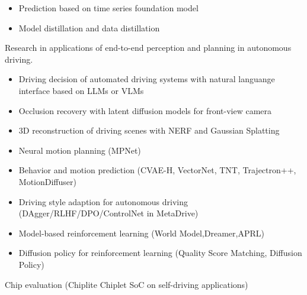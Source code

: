 \documentclass[../cv.tex]{subfiles}
\begin{document}
\begin{cventries}
{\begin{cvitems}
\begin{itemize}
				      $\rightarrow$ \textbf{funes-ts} \href{https://github.com/binjian/funes-ts/}{\faGithub}
				\item Prediction based on time series foundation model
				\item Model distillation and data distillation
			\end{itemize}
			\item Research in applications of end-to-end perception and planning in autonomous driving.
			\begin{itemize}
				\item Driving decision of automated driving systems with natural languange interface based on LLMs or VLMs \supercite{Xin_LLM_24}  \supercite{Xin_VLM_24}
				\item Occlusion recovery with latent diffusion models for front-view camera \supercite{Xin_Latent_Diffusion_23}
				\item 3D reconstruction of driving scenes with NERF and Gaussian Splatting
				\item Neural motion planning (MPNet)
				\item Behavior and motion prediction (CVAE-H, VectorNet, TNT, Trajectron++, MotionDiffuser)
				\item Driving style adaption for autonomous driving (DAgger/RLHF/DPO/ControlNet in MetaDrive)
				\item Model-based reinforcement learning (World Model,Dreamer,APRL)
				\item Diffusion policy for reinforcement learning (Quality Score Matching, Diffusion Policy)
			\end{itemize}
			\item Chip evaluation (Chiplite Chiplet SoC on self-driving applications)
		\end{cvitems}
	}


\end{cventries}
\end{document}
